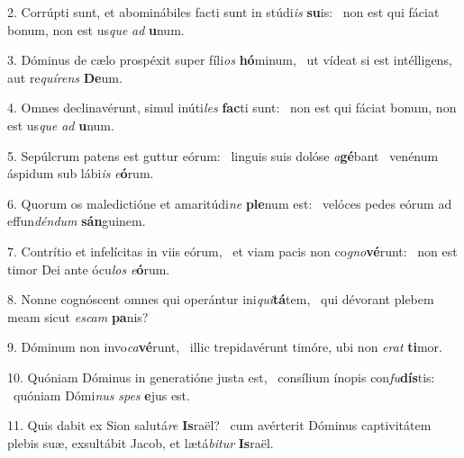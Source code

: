 2. Corrúpti sunt, et abominábiles facti sunt in stúdi\textit{is} \textbf{su}is: \ast\  non est qui fáciat bonum, non est us\textit{que} \textit{ad} \textbf{u}num.\

3. Dóminus de cælo prospéxit super fíli\textit{os} \textbf{hó}minum, \ast\  ut vídeat si est intélligens, aut re\textit{quí}\textit{rens} \textbf{De}um.\

4. Omnes declinavérunt, simul inúti\textit{les} \textbf{fac}ti sunt: \ast\  non est qui fáciat bonum, non est us\textit{que} \textit{ad} \textbf{u}num.\

5. Sepúlcrum patens est guttur eórum: \dag\  linguis suis dolóse \textit{a}\textbf{gé}bant \ast\  venénum áspidum sub lábi\textit{is} \textit{e}\textbf{ó}rum.\

6. Quorum os maledictióne et amaritúdi\textit{ne} \textbf{ple}num est: \ast\  velóces pedes eórum ad effun\textit{dén}\textit{dum} \textbf{sán}guinem.\

7. Contrítio et infelícitas in viis eórum, \dag\  et viam pacis non co\textit{gno}\textbf{vé}runt: \ast\  non est timor Dei ante ócu\textit{los} \textit{e}\textbf{ó}rum.\

8. Nonne cognóscent omnes qui operántur ini\textit{qui}\textbf{tá}tem, \ast\  qui dévorant plebem meam sicut \textit{es}\textit{cam} \textbf{pa}nis?\

9. Dóminum non invo\textit{ca}\textbf{vé}runt, \ast\  illic trepidavérunt timóre, ubi non \textit{e}\textit{rat} \textbf{ti}mor.\

10. Quóniam Dóminus in generatióne justa est, \dag\  consílium ínopis con\textit{fu}\textbf{dís}tis: \ast\  quóniam Dómi\textit{nus} \textit{spes} \textbf{e}jus est.\

11. Quis dabit ex Sion salutá\textit{re} \textbf{Is}raël? \ast\  cum avérterit Dóminus captivitátem plebis suæ, exsultábit Jacob, et lætá\textit{bi}\textit{tur} \textbf{Is}raël.\

